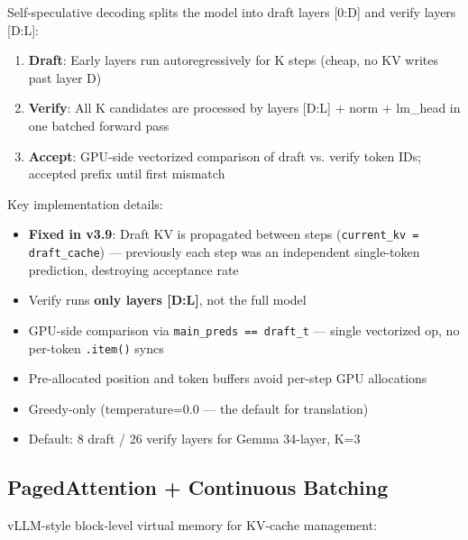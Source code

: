 \documentclass[11pt,a4paper,twoside]{article}
\begin{document}
Self-speculative decoding splits the model into draft layers [0:D] and verify
layers [D:L]:

\begin{enumerate}[nosep]
  \item \textbf{Draft}: Early layers run autoregressively for K steps (cheap,
    no KV writes past layer D)
  \item \textbf{Verify}: All K candidates are processed by layers [D:L] + norm
    + lm\_head in one batched forward pass
  \item \textbf{Accept}: GPU-side vectorized comparison of draft vs. verify
    token IDs; accepted prefix until first mismatch
\end{enumerate}

Key implementation details:
\begin{itemize}[nosep]
  \item \textbf{Fixed in v3.9}: Draft KV is propagated between steps
    (\texttt{current\_kv = draft\_cache}) --- previously each step was an
    independent single-token prediction, destroying acceptance rate
  \item Verify runs \textbf{only layers [D:L]}, not the full model
  \item GPU-side comparison via \texttt{main\_preds == draft\_t} --- single
    vectorized op, no per-token \texttt{.item()} syncs
  \item Pre-allocated position and token buffers avoid per-step GPU allocations
  \item Greedy-only (temperature=0.0 --- the default for translation)
  \item Default: 8 draft / 26 verify layers for Gemma 34-layer, K=3
\end{itemize}

\subsection{PagedAttention + Continuous Batching}

vLLM-style block-level virtual memory for KV-cache management:
\end{document}
